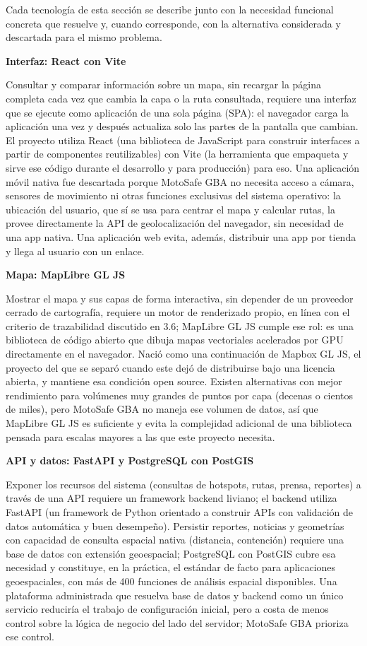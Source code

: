 Cada tecnología de esta sección se describe junto con la necesidad
funcional concreta que resuelve y, cuando corresponde, con la
alternativa considerada y descartada para el mismo problema.

\textbf{Interfaz: React con Vite}

Consultar y comparar información sobre un mapa, sin recargar la página
completa cada vez que cambia la capa o la ruta consultada, requiere una
interfaz que se ejecute como aplicación de una sola página (SPA): el
navegador carga la aplicación una vez y después actualiza solo las
partes de la pantalla que cambian. El proyecto utiliza React (una
biblioteca de JavaScript para construir interfaces a partir de
componentes reutilizables) con Vite (la herramienta que empaqueta y
sirve ese código durante el desarrollo y para producción) para eso. Una
aplicación móvil nativa fue descartada porque MotoSafe GBA no necesita
acceso a cámara, sensores de movimiento ni otras funciones exclusivas
del sistema operativo: la ubicación del usuario, que sí se usa para
centrar el mapa y calcular rutas, la provee directamente la API de
geolocalización del navegador, sin necesidad de una app nativa. Una
aplicación web evita, además, distribuir una app por tienda y llega al
usuario con un enlace.

\textbf{Mapa: MapLibre GL JS}

Mostrar el mapa y sus capas de forma interactiva, sin depender de un
proveedor cerrado de cartografía, requiere un motor de renderizado
propio, en línea con el criterio de trazabilidad discutido en 3.6;
MapLibre GL JS cumple ese rol: es una biblioteca de código abierto que
dibuja mapas vectoriales acelerados por GPU directamente en el
navegador. Nació como una continuación de Mapbox GL JS, el proyecto del
que se separó cuando este dejó de distribuirse bajo una licencia
abierta, y mantiene esa condición open source. Existen alternativas con
mejor rendimiento para volúmenes muy grandes de puntos por capa (decenas
o cientos de miles), pero MotoSafe GBA no maneja ese volumen de datos,
así que MapLibre GL JS es suficiente y evita la complejidad adicional de
una biblioteca pensada para escalas mayores a las que este proyecto
necesita.

\textbf{API y datos: FastAPI y PostgreSQL con PostGIS}

Exponer los recursos del sistema (consultas de hotspots, rutas, prensa,
reportes) a través de una API requiere un framework backend liviano; el
backend utiliza FastAPI (un framework de Python orientado a construir
APIs con validación de datos automática y buen desempeño). Persistir
reportes, noticias y geometrías con capacidad de consulta espacial
nativa (distancia, contención) requiere una base de datos con extensión
geoespacial; PostgreSQL con PostGIS cubre esa necesidad y constituye, en
la práctica, el estándar de facto para aplicaciones geoespaciales, con
más de 400 funciones de análisis espacial disponibles. Una plataforma
administrada que resuelva base de datos y backend como un único servicio
reduciría el trabajo de configuración inicial, pero a costa de menos
control sobre la lógica de negocio del lado del servidor; MotoSafe GBA
prioriza ese control.


